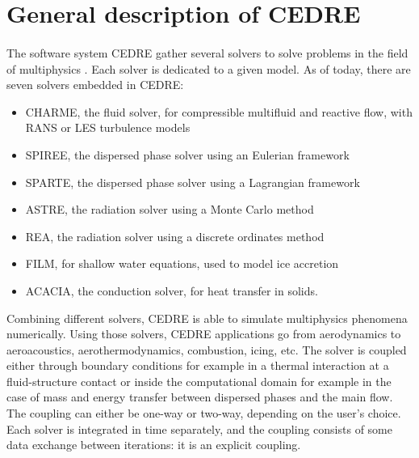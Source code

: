   \pagebreak
  \section{General description of CEDRE}

    \paragraph{}
    The software system CEDRE gather several solvers to solve problems in the field of multiphysics \cite{ReflochCourbetMurroneEtAl2011}.
    Each solver is dedicated to a given model.
    As of today, there are seven solvers embedded in CEDRE:
    \begin{itemize}
      \item CHARME, the fluid solver, for compressible multifluid and reactive flow, with RANS or LES turbulence models
      \item SPIREE, the dispersed phase solver using an Eulerian framework
      \item SPARTE, the dispersed phase solver using a Lagrangian framework
      \item ASTRE, the radiation solver using a Monte Carlo method
      \item REA, the radiation solver using a discrete ordinates method
      \item FILM, for shallow water equations, used to model ice accretion
      \item ACACIA, the conduction solver, for heat transfer in solids.
    \end{itemize}
    Combining different solvers, CEDRE is able to simulate multiphysics phenomena numerically.
    Using those solvers, CEDRE applications go from aerodynamics to aeroacoustics, aerothermodynamics, combustion, icing, etc.
    The solver is coupled either through boundary conditions for example in a thermal interaction at a fluid-structure contact or inside the computational domain for example in the case of mass and energy transfer between dispersed phases and the main flow.
    The coupling can either be one-way or two-way, depending on the user's choice.
    Each solver is integrated in time separately, and the coupling consists of some data exchange between iterations: it is an explicit coupling.


